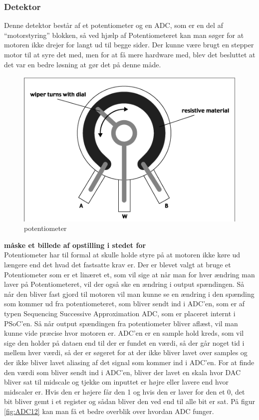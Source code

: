 \subsubsection{Detektor}
Denne detektor består af et potentiometer og en ADC, som er en del af “motorstyring” blokken, så ved hjælp af Potentiometeret kan man søger for at motoren ikke drejer for langt ud til begge sider.  Der kunne være brugt en stepper motor til at syre det med, men for at få mere hardware med, blev det besluttet at det var en bedre løsning at gør det på denne måde.
\begin{figure}[H]
	\centering
	\includegraphics[width=\textwidth]{Afsnit/DesignOgImplementering/images/poten}
	\caption{potentiometer}
	\label{fig:poten}
\end{figure}
\textbf{måske et billede af opstilling i stedet for}\\
Potentiometer har til formal at skulle holde styre på at motoren ikke køre ud længere end det hvad det fastsatte krav er. Der er blevet valgt at bruge et Potentiometer som er et linæret et, som vil sige at når man for hver ændring man laver på Potentiometeret, vil der også ske en ændring i output spændingen. Så når den bliver fast gjord til motoren vil man kunne se en ændring i den spænding som kommer ud fra potentiometeret, som bliver sendt ind i ADC’en, som er af typen Sequencing Successive Approximation ADC, som er placeret internt i PSoC’en. Så når output spændingen fra potentiometer bliver aflæst, vil man kunne vide præcise hvor motoren er.  
ADC’en er en sample hold kreds, som vil sige den holder på dataen end til der er fundet en værdi, så der går noget tid i mellem hver værdi, så der er søgeret for at der ikke bliver lavet over samples og der ikke bliver lavet aliasing af det signal som kommer ind i ADC’en. For at finde den værdi som bliver sendt ind i ADC'en, bliver der lavet en skala hvor DAC bliver sat til midscale og tjekke om inputtet er højre eller lavere end hvor midscaler er. Hvis den er højere får den 1 og hvis den er laver for den et 0, det bit bliver gemt i et register og sådan bliver den ved end til alle bit er sat. På figur \ref{fig:ADC12} kan man få et bedre overblik over hvordan ADC funger. 


